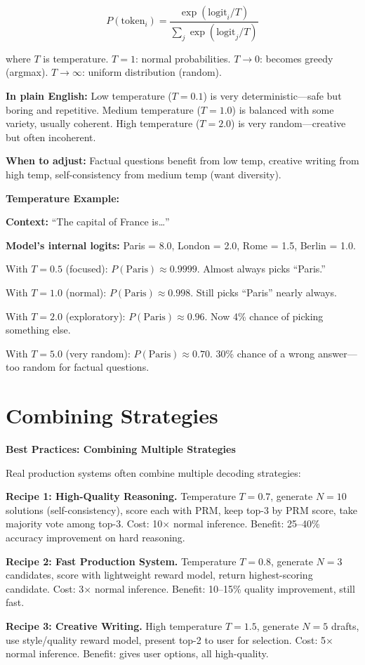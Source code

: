 \begin{chapterenv}
\begin{infobox}
$$P(\text{token}_i) = \frac{\exp(\text{logit}_i / T)}{\sum_j \exp(\text{logit}_j / T)}$$

where $T$ is temperature. $T = 1$: normal probabilities. $T \to 0$: becomes greedy (argmax). $T \to \infty$: uniform distribution (random).

\textbf{In plain English:} Low temperature ($T=0.1$) is very deterministic---safe but boring and repetitive. Medium temperature ($T=1.0$) is balanced with some variety, usually coherent. High temperature ($T=2.0$) is very random---creative but often incoherent.

\textbf{When to adjust:} Factual questions benefit from low temp, creative writing from high temp, self-consistency from medium temp (want diversity).
\end{infobox}

\textbf{Temperature Example:}

\textbf{Context:} ``The capital of France is\ldots''

\textbf{Model's internal logits:} Paris = 8.0, London = 2.0, Rome = 1.5, Berlin = 1.0.

With $T = 0.5$ (focused): $P(\text{Paris}) \approx 0.9999$. Almost always picks ``Paris.''

With $T = 1.0$ (normal): $P(\text{Paris}) \approx 0.998$. Still picks ``Paris'' nearly always.

With $T = 2.0$ (exploratory): $P(\text{Paris}) \approx 0.96$. Now 4\% chance of picking something else.

With $T = 5.0$ (very random): $P(\text{Paris}) \approx 0.70$. 30\% chance of a wrong answer---too random for factual questions.

\section{Combining Strategies}

\begin{infobox}
\textbf{Best Practices: Combining Multiple Strategies}

Real production systems often combine multiple decoding strategies:

\textbf{Recipe 1: High-Quality Reasoning.} Temperature $T=0.7$, generate $N=10$ solutions (self-consistency), score each with PRM, keep top-3 by PRM score, take majority vote among top-3. Cost: 10$\times$ normal inference. Benefit: 25--40\% accuracy improvement on hard reasoning.

\textbf{Recipe 2: Fast Production System.} Temperature $T=0.8$, generate $N=3$ candidates, score with lightweight reward model, return highest-scoring candidate. Cost: 3$\times$ normal inference. Benefit: 10--15\% quality improvement, still fast.

\textbf{Recipe 3: Creative Writing.} High temperature $T=1.5$, generate $N=5$ drafts, use style/quality reward model, present top-2 to user for selection. Cost: 5$\times$ normal inference. Benefit: gives user options, all high-quality.
\end{infobox}

\end{chapterenv}